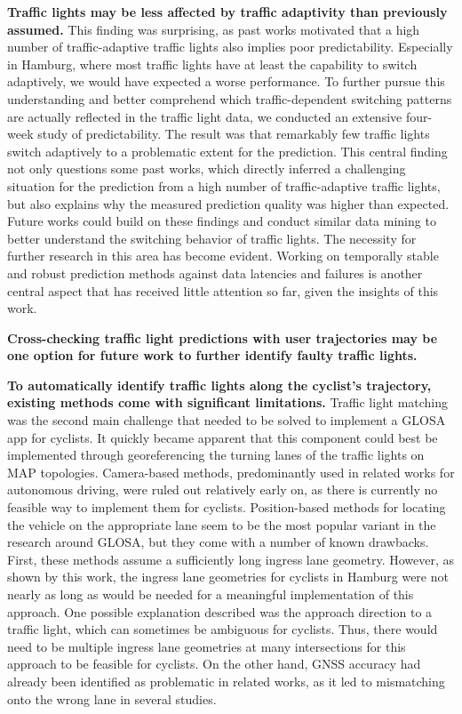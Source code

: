 \textbf{\color{cidarkblue}Traffic lights may be less affected by traffic adaptivity than previously assumed.} This finding was surprising, as past works motivated that a high number of traffic-adaptive traffic lights also implies poor predictability. Especially in Hamburg, where most traffic lights have at least the capability to switch adaptively, we would have expected a worse performance. To further pursue this understanding and better comprehend which traffic-dependent switching patterns are actually reflected in the traffic light data, we conducted an extensive four-week study of predictability. The result was that remarkably few traffic lights switch adaptively to a problematic extent for the prediction. This central finding not only questions some past works, which directly inferred a challenging situation for the prediction from a high number of traffic-adaptive traffic lights, but also explains why the measured prediction quality was higher than expected. Future works could build on these findings and conduct similar data mining to better understand the switching behavior of traffic lights. The necessity for further research in this area has become evident. Working on temporally stable and robust prediction methods against data latencies and failures is another central aspect that has received little attention so far, given the insights of this work.

\textbf{\color{cidarkblue}Cross-checking traffic light predictions with user trajectories may be one option for future work to further identify faulty traffic lights.}

\textbf{\color{cidarkblue}To automatically identify traffic lights along the cyclist's trajectory, existing methods come with significant limitations.} Traffic light matching was the second main challenge that needed to be solved to implement a GLOSA app for cyclists. It quickly became apparent that this component could best be implemented through georeferencing the turning lanes of the traffic lights on MAP topologies. Camera-based methods, predominantly used in related works for autonomous driving, were ruled out relatively early on, as there is currently no feasible way to implement them for cyclists. Position-based methods for locating the vehicle on the appropriate lane seem to be the most popular variant in the research around GLOSA, but they come with a number of known drawbacks. First, these methods assume a sufficiently long ingress lane geometry. However, as shown by this work, the ingress lane geometries for cyclists in Hamburg were not nearly as long as would be needed for a meaningful implementation of this approach. One possible explanation described was the approach direction to a traffic light, which can sometimes be ambiguous for cyclists. Thus, there would need to be multiple ingress lane geometries at many intersections for this approach to be feasible for cyclists. On the other hand, GNSS accuracy had already been identified as problematic in related works, as it led to mismatching onto the wrong lane in several studies.

